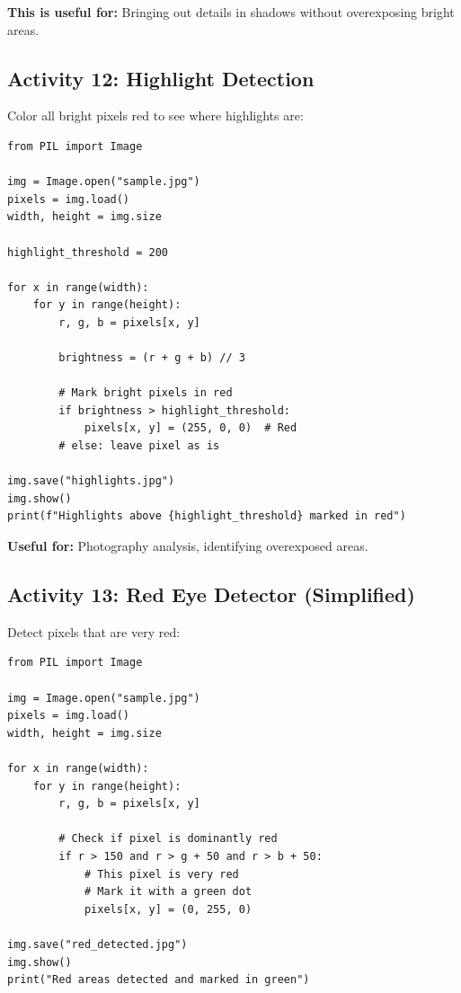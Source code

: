 \documentclass[11pt]{article}
\begin{document}
\textbf{This is useful for:} Bringing out details in shadows without overexposing bright areas.

\subsection*{Activity 12: Highlight Detection}

Color all bright pixels red to see where highlights are:

\begin{lstlisting}
from PIL import Image

img = Image.open("sample.jpg")
pixels = img.load()
width, height = img.size

highlight_threshold = 200

for x in range(width):
    for y in range(height):
        r, g, b = pixels[x, y]

        brightness = (r + g + b) // 3

        # Mark bright pixels in red
        if brightness > highlight_threshold:
            pixels[x, y] = (255, 0, 0)  # Red
        # else: leave pixel as is

img.save("highlights.jpg")
img.show()
print(f"Highlights above {highlight_threshold} marked in red")
\end{lstlisting}

\textbf{Useful for:} Photography analysis, identifying overexposed areas.

\subsection*{Activity 13: Red Eye Detector (Simplified)}

Detect pixels that are very red:

\begin{lstlisting}
from PIL import Image

img = Image.open("sample.jpg")
pixels = img.load()
width, height = img.size

for x in range(width):
    for y in range(height):
        r, g, b = pixels[x, y]

        # Check if pixel is dominantly red
        if r > 150 and r > g + 50 and r > b + 50:
            # This pixel is very red
            # Mark it with a green dot
            pixels[x, y] = (0, 255, 0)

img.save("red_detected.jpg")
img.show()
print("Red areas detected and marked in green")
\end{lstlisting}
\end{document}
